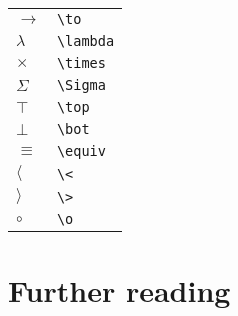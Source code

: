 \documentclass[a4paper,UKenglish]{tufte-handout}
\theoremstyle{definition}
\begin{document}
\begin{tabular}{ll}
$\to$& \texttt{\textbackslash{}to} \\
$\lambda$& \texttt{\textbackslash{}lambda} \\
$\times$& \texttt{\textbackslash{}times} \\
$\Sigma$& \texttt{\textbackslash{}Sigma} \\
$\top$& \texttt{\textbackslash{}top} \\
$\bot$& \texttt{\textbackslash{}bot} \\
$\equiv$& \texttt{\textbackslash{}equiv} \\
$\langle$& \texttt{\textbackslash{}<} \\
$\rangle$& \texttt{\textbackslash{}>} \\
$\circ$& \texttt{\textbackslash{}o} \\
\end{tabular}

\section{Further reading}
\end{document}
